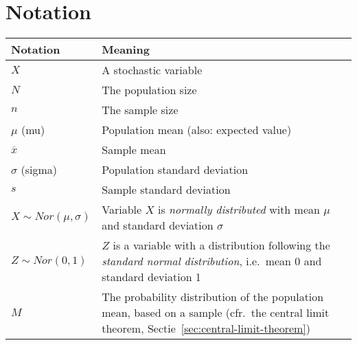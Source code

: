\chapter{Notation}

\begin{table}
  \centering
  \begin{tabular}{p{}p{}}
    \toprule
    \textbf{Notation} & \textbf{Meaning} \\
    \midrule
    $X$                       & A stochastic variable \\
    $N$                       & The population size \\
    $n$                       & The sample size\\
    $\mu$ (mu)                & Population mean (also: expected value) \\
    $\overline{x}$            & Sample mean \\
    $\sigma$ (sigma)          & Population standard deviation \\
    $s$                       & Sample standard deviation \\
    $X \sim Nor(\mu, \sigma)$ & Variable $X$ is \emph{normally distributed} with mean $\mu$ and standard deviation $\sigma$ \\
    $Z \sim Nor(0, 1)$        & $Z$ is a variable with a distribution following the \emph{standard normal distribution}, i.e.~mean 0 and standard deviation 1 \\
    $M$                       & The probability distribution of the population mean, based on a sample (cfr.~the central limit theorem, Sectie~\ref{sec:central-limit-theorem}) \\

    \bottomrule
  \end{tabular}
\end{table}
